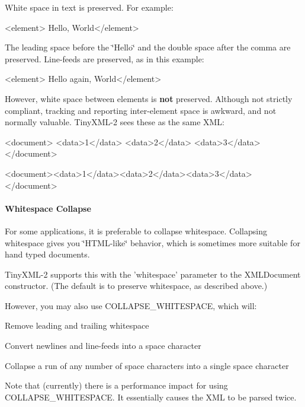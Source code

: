 White space in text is preserved. For example\+: \begin{DoxyVerb}<element> Hello,  World</element>
\end{DoxyVerb}


The leading space before the \char`\"{}\+Hello\char`\"{} and the double space after the comma are preserved. Line-\/feeds are preserved, as in this example\+: \begin{DoxyVerb}<element> Hello again,  
          World</element>
\end{DoxyVerb}


However, white space between elements is {\bfseries not} preserved. Although not strictly compliant, tracking and reporting inter-\/element space is awkward, and not normally valuable. Tiny\+X\+M\+L-\/2 sees these as the same X\+M\+L\+: \begin{DoxyVerb}<document>
    <data>1</data>
    <data>2</data>
    <data>3</data>
</document>

<document><data>1</data><data>2</data><data>3</data></document>
\end{DoxyVerb}


\paragraph*{Whitespace Collapse}

For some applications, it is preferable to collapse whitespace. Collapsing whitespace gives you \char`\"{}\+H\+T\+M\+L-\/like\char`\"{} behavior, which is sometimes more suitable for hand typed documents.

Tiny\+X\+M\+L-\/2 supports this with the 'whitespace' parameter to the X\+M\+L\+Document constructor. (The default is to preserve whitespace, as described above.)

However, you may also use C\+O\+L\+L\+A\+P\+S\+E\+\_\+\+W\+H\+I\+T\+E\+S\+P\+A\+C\+E, which will\+:


\begin{DoxyItemize}
\item Remove leading and trailing whitespace
\item Convert newlines and line-\/feeds into a space character
\item Collapse a run of any number of space characters into a single space character
\end{DoxyItemize}

Note that (currently) there is a performance impact for using C\+O\+L\+L\+A\+P\+S\+E\+\_\+\+W\+H\+I\+T\+E\+S\+P\+A\+C\+E. It essentially causes the X\+M\+L to be parsed twice.

